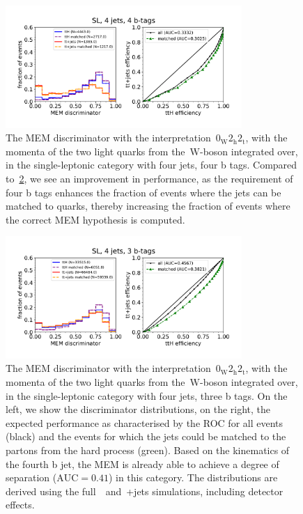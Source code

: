 \begin{figure}[ht]
\begin{centering}
\includegraphics[width = 0.8\textwidth]{figures/mem/mem_sl_j4_t4.pdf}
\caption[MEM with the~$0_{\mathrm{W}} 2_{\mathrm{h}} 2_{\mathrm{t}}$ interpretation in the 4 jet, 4 b~tag category]{The MEM discriminator with the interpretation~$0_{\mathrm{W}} 2_{\mathrm{h}} 2_{\mathrm{t}}$, with the momenta of the two light quarks from the~$\mathrm{W}$-boson integrated over, in the single-leptonic category with four jets, four b tags. Compared to~\cref{fig:mem_sl_j4_t3}, we see an improvement in performance, as the requirement of four b tags enhances the fraction of events where the jets can be matched to quarks, thereby increasing the fraction of events where the correct MEM hypothesis is computed.}
\label{fig:mem_sl_j4_t4}
\end{centering}
\end{figure}

\begin{figure}[ht]
\begin{centering}
\includegraphics[width = 0.8\textwidth]{figures/mem/mem_sl_j4_t3.pdf}
\caption[MEM with the~$0_{\mathrm{W}} 2_{\mathrm{h}} 2_{\mathrm{t}}$ interpretation in the 4 jet, 3 b~tag category]{The MEM discriminator with the interpretation~$0_{\mathrm{W}} 2_{\mathrm{h}} 2_{\mathrm{t}}$, with the momenta of the two light quarks from the~$\mathrm{W}$-boson integrated over, in the single-leptonic category with four jets, three b tags. On the left, we show the discriminator distributions, on the right, the expected performance as characterised by the ROC for all events (black) and the events for which the jets could be matched to the partons from the hard process (green). Based on the kinematics of the fourth b jet, the MEM is already able to achieve a degree of separation ($\mathrm{AUC} = 0.41$) in this category. The distributions are derived using the full~\ttHbb~and~\ttbar+jets simulations, including detector effects.}
\label{fig:mem_sl_j4_t3}
\end{centering}
\end{figure}

